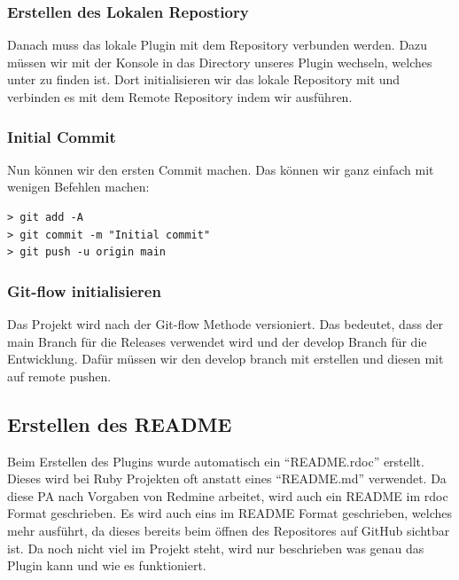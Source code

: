 \subsubsection{Erstellen des Lokalen Repostiory}
Danach muss das lokale Plugin mit dem Repository verbunden werden. Dazu müssen wir mit der Konsole in das Directory
unseres Plugin wechseln, welches unter  zu finden ist. \newline
Dort initialisieren wir das lokale Repository mit  und verbinden es mit dem Remote
Repository indem wir  ausführen.

\subsubsection{Initial Commit}
Nun können wir den ersten Commit machen. Das können wir ganz einfach mit wenigen Befehlen machen:
\begin{codebox}[]
  \begin{verbatim}
> git add -A
> git commit -m "Initial commit"
> git push -u origin main
  \end{verbatim}
\end{codebox}

\subsubsection{Git-flow initialisieren}
Das Projekt wird nach der Git-flow Methode versioniert. Das bedeutet, dass der main Branch für die Releases
verwendet wird und der develop Branch für die Entwicklung. \newline
Dafür müssen wir den develop branch mit  erstellen und diesen
mit  auf remote pushen. \newline

\subsection{Erstellen des README}
Beim Erstellen des Plugins wurde automatisch ein \enquote{README.rdoc} erstellt. Dieses wird bei Ruby Projekten
oft anstatt eines \enquote{README.md} verwendet. Da diese PA nach Vorgaben von Redmine arbeitet, wird auch ein
README im rdoc Format geschrieben. Es wird auch eins im README Format geschrieben, welches mehr ausführt, da dieses
bereits beim öffnen des Repositores auf GitHub sichtbar ist. \newline
Da noch nicht viel im Projekt steht, wird nur beschrieben was genau das Plugin kann und wie es funktioniert.

